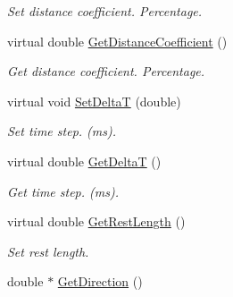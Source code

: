 \begin{DoxyCompactItemize}
\begin{DoxyCompactList}\small\item\em Set distance coefficient. Percentage. \item\end{DoxyCompactList}\item 
\hypertarget{classvtkSpring_a10eea4040d3ebfcd8fb2de9c76f8ae6d}{
virtual double \hyperlink{classvtkSpring_a10eea4040d3ebfcd8fb2de9c76f8ae6d}{GetDistanceCoefficient} ()}
\label{classvtkSpring_a10eea4040d3ebfcd8fb2de9c76f8ae6d}

\begin{DoxyCompactList}\small\item\em Get distance coefficient. Percentage. \item\end{DoxyCompactList}\item 
\hypertarget{classvtkSpring_afddd5e71e4b4e101c243e880df21a45a}{
virtual void \hyperlink{classvtkSpring_afddd5e71e4b4e101c243e880df21a45a}{SetDeltaT} (double)}
\label{classvtkSpring_afddd5e71e4b4e101c243e880df21a45a}

\begin{DoxyCompactList}\small\item\em Set time step. (ms). \item\end{DoxyCompactList}\item 
\hypertarget{classvtkSpring_a3cc7e20b04ca8e341264bfdce9409565}{
virtual double \hyperlink{classvtkSpring_a3cc7e20b04ca8e341264bfdce9409565}{GetDeltaT} ()}
\label{classvtkSpring_a3cc7e20b04ca8e341264bfdce9409565}

\begin{DoxyCompactList}\small\item\em Get time step. (ms). \item\end{DoxyCompactList}\item 
\hypertarget{classvtkSpring_a7febd41964aa3acc76cd2456f85206d5}{
virtual double \hyperlink{classvtkSpring_a7febd41964aa3acc76cd2456f85206d5}{GetRestLength} ()}
\label{classvtkSpring_a7febd41964aa3acc76cd2456f85206d5}

\begin{DoxyCompactList}\small\item\em Set rest length. \item\end{DoxyCompactList}\item 
\hypertarget{classvtkSpring_a6da4bec7c2adb0f4c3424c437c04eca2}{
double $\ast$ \hyperlink{classvtkSpring_a6da4bec7c2adb0f4c3424c437c04eca2}{GetDirection} ()}
\label{classvtkSpring_a6da4bec7c2adb0f4c3424c437c04eca2}


\end{DoxyCompactItemize}
